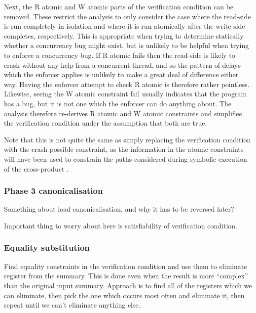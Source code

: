 Next, the R atomic and W atomic parts of the verification condition
can be removed.  These restrict the analysis to only consider the case
where the read-side is run completely in isolation and where it is run
atomically after the write-side completes, respectively.  This is
appropriate when trying to determine statically whether a concurrency
bug might exist, but is unlikely to be helpful when trying to enforce
a concurrency bug.  If R atomic fails then the read-side is likely to
crash without any help from a concurrent thread, and so the pattern of
delays which the enforcer applies is unlikely to make a great deal of
difference either way.  Having the enforcer attempt to check R atomic
is therefore rather pointless.  Likewise, seeing the W atomic
constraint fail usually indicates that the program has a bug, but it
is not one which the enforcer can do anything about.  The analysis
therefore re-derives R atomic and W atomic constraints and simplifies
the verification condition under the assumption that both are true.

Note that this is not quite the same as simply replacing the
verification condition with the crash possible constraint, as the
information in the atomic constraints will have been used to constrain
the paths considered during symbolic execution of the cross-product
{\StateMachine}.  


\subsubsection{Phase 3 canonicalisation}

Something about load canonicalisation, and why it has to be reversed
later?

Important thing to worry about here is satisfiability of verification condition.

\subsubsection{Equality substitution}
Find equality constraints in the verification condition and use them to eliminate register from the summary.
This is done even when the result is more ``complex'' than the original input summary.
Approach is to find all of the registers which we can eliminate, then pick the one which occurs most often and eliminate it, then repeat until we can't eliminate anything else.

